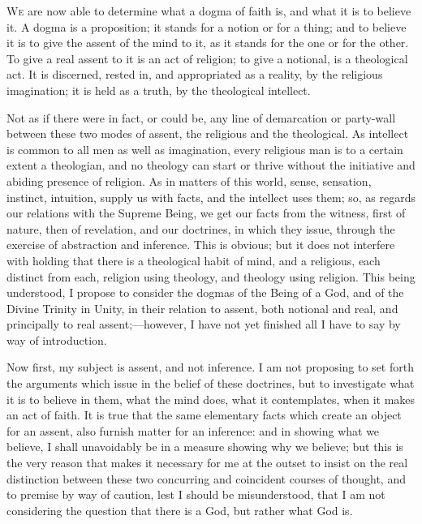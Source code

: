 
W\textsc{e} are now able to determine what a dogma of faith is, and
what it is to believe it. A dogma is a proposition; it stands for a
notion or for a thing; and to believe it is to give the assent of the
mind to it, as it stands for the one or for the other. To give a real
assent to it is an act of religion; to give a notional, is a
theological act. It is discerned, rested in, and appropriated as a
reality, by the religious imagination; it is held as a truth, by the
theological intellect.

Not as if there were in fact, or could be, any line of demarcation
or party-wall between these two modes of assent, the religious and the
theological. As intellect is common to all men as well as imagination,
every religious man is to a certain extent a theologian, and no
theology can start or thrive without the initiative and abiding
presence of religion. As in matters of this world, sense, sensation,
instinct, intuition, supply us with facts, and the intellect uses
them; so, as regards our relations with the Supreme Being, we get our
facts from the witness, first of nature, then of revelation, and
our doctrines, in which they issue, through the exercise of
abstraction and inference. This is obvious; but it does not interfere
with holding that there is a theological habit of mind, and a
religious, each distinct from each, religion using theology, and
theology using religion. This being understood, I propose to consider
the dogmas of the Being of a God, and of the Divine Trinity in Unity,
in their relation to assent, both notional and real, and principally
to real assent;—however, I have not yet finished all I have to say
by way of introduction.

Now first, my subject is assent, and not inference. I am not
proposing to set forth the arguments which issue in the belief of
these doctrines, but to investigate what it is to believe in them,
what the mind does, what it contemplates, when it makes an act of
faith. It is true that the same elementary facts which create an
object for an assent, also furnish matter for an inference: and in
showing what we believe, I shall unavoidably be in a measure showing
why we believe; but this is the very reason that makes it necessary
for me at the outset to insist on the real distinction between these
two concurring and coincident courses of thought, and to premise by
way of caution, lest I should be misunderstood, that I am not
considering the question that there is a God, but rather what God is.

